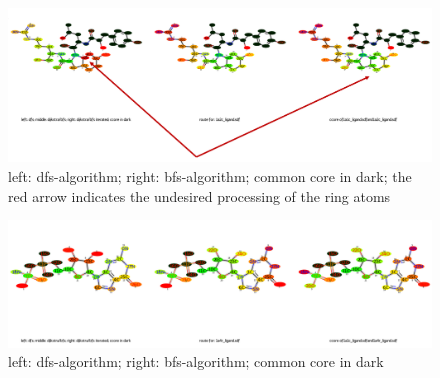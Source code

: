 \begin{figure}

\includegraphics[scale=0.4]{2ring_example}\caption{left: dfs-algorithm; right: bfs-algorithm; common core in dark; the
red arrow indicates the undesired processing of the ring atoms}

\end{figure}

\begin{figure}

\includegraphics[scale=0.4]{2ring_example2}\caption{left: dfs-algorithm; right: bfs-algorithm; common core in dark}

\end{figure}
